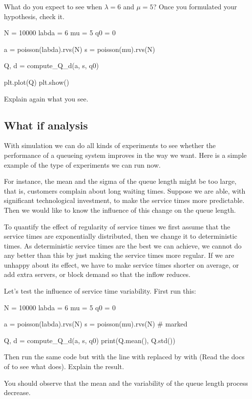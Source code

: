 \begin{exercise}
What do you expect to see when $\lambda=6$ and $\mu=5$? Once you formulated your hypothesis, check it.

\begin{pyverbatim}
N = 10000
labda = 6
mu = 5
q0 = 0

a = poisson(labda).rvs(N)
s = poisson(mu).rvs(N)

Q, d = compute_Q_d(a, s, q0)

plt.plot(Q)
plt.show()
  \end{pyverbatim}
Explain again what you see.
\end{exercise}

\subsection{What if analysis}
\label{sec:what-if-analysis}

With simulation we can do all kinds of experiments to see whether the performance of a queueing system improves in the way we want. Here is a simple example of the type of experiments we can run now. 

For instance,  the mean and the sigma of the queue length  might be too large, that is, customers complain about long waiting times.  Suppose we are able, with significant technological investment, to make the service times more predictable. Then we would like to know  the influence of this change on the queue length.

To quantify the effect of regularity of service times we first assume that the service times are exponentially distributed, then we change it to deterministic times.
As deterministic service times are the best we can achieve,  we cannot do any better than this by just making the service times more regular. If we are unhappy about its effect, we have to make service times shorter on average, or add extra servers, or block demand so that the inflow reduces. 

\begin{exercise}
Let's test the influence of service time variability. First run this:
\begin{pyverbatim}
N = 10000
labda = 6
mu = 5
q0 = 0

a = poisson(labda).rvs(N)
s = poisson(mu).rvs(N)  # marked

Q, d = compute_Q_d(a, s, q0)
print(Q.mean(), Q.std())
\end{pyverbatim}
Then run the same code but with the line with  replaced by with  (Read the docs of  to see what  does).  Explain the result.
\begin{solution}
	You should observe that the mean and the variability of the queue length process decrease.
\end{solution}
\end{exercise}



